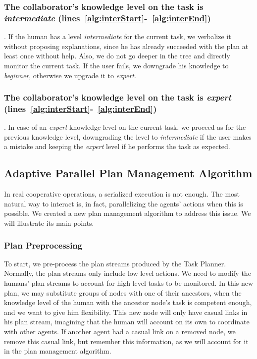 \subsubsection{The collaborator's knowledge level on the task is \textit{intermediate} (lines~\ref{alg:interStart}-~\ref{alg:interEnd})}. If the human has a level \textit{intermediate} for the current task, we verbalize it without proposing explanations, since he has already  succeeded with the plan at least once without help. Also, we do not go deeper in the tree and directly monitor the current task. If the user  fails, we downgrade his knowledge to \textit{beginner}, otherwise we upgrade it to \textit{expert}.

\subsubsection{The collaborator's knowledge level on the task is \textit{expert} (lines~\ref{alg:interStart}-~\ref{alg:interEnd})}. In case of an \textit{expert} knowledge level on the current task, we  proceed as for the previous knowledge level, downgrading the level to \textit{intermediate} if the user makes a mistake and keeping the \textit{expert} level if he performs the task as expected.


\subsection{Adaptive Parallel Plan Management Algorithm}
In real cooperative operations, a serialized execution is not enough. The most natural way to interact is, in fact, parallelizing the agents' actions when this is possible. We created a new plan management algorithm to address this issue. We will illustrate its main points.

\subsubsection{Plan Preprocessing}
To start, we pre-process the plan streams produced by the Task Planner. Normally, the plan streams only include low level actions. We need to  modify the humans' plan streams to account for high-level tasks to be monitored. In this new plan, we may substitute groups of nodes with one of their ancestors, when the knowledge level of the human with the ancestor node's task is competent enough, and we want to give him flexibility. This new node will only have casual links in his plan stream, imagining that the human will account on its own to coordinate with other agents. If another agent had a casual link on a removed node, we remove this casual link, but remember this information, as we will account for it in the plan management algorithm.

